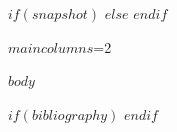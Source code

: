 \documentclass[12pt]{article}
\newif\ifhfwganon
\newcommand{\hfwgmaincolumns}{$maincolumns$}
\newcommand{\hfwgmaincolumns}{1}
\begin{document}
$if(snapshot)$
\vspace{0.5em}
$else$
\clearpage
$endif$
\setcounter{page}{1}


\ifnum\hfwgmaincolumns=2\relax
  \twocolumn
\fi

\ifhfwganon
\begingroup
\small
\noindent\textit{This manuscript is set to anonymous mode. Identifying metadata fields are suppressed on the title page.}\par
\endgroup
\vspace{1em}
\fi

$body$

$if(bibliography)$
\clearpage
$endif$
\end{document}
